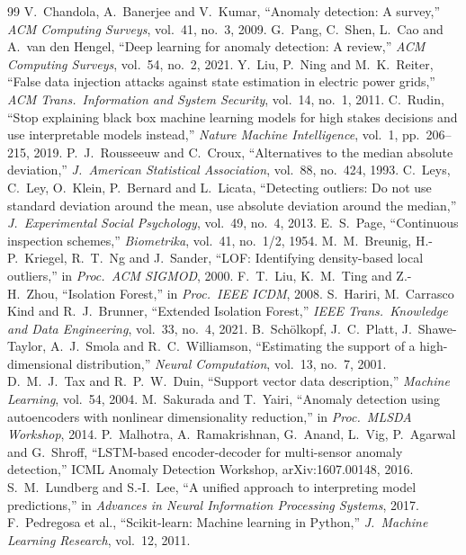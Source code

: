 \documentclass[11pt,a4paper]{article}
\begin{document}
\begin{thebibliography}{99}
 V.~Chandola, A.~Banerjee and V.~Kumar, ``Anomaly detection: A survey,'' \emph{ACM Computing Surveys}, vol.~41, no.~3, 2009.
 G.~Pang, C.~Shen, L.~Cao and A.~van den Hengel, ``Deep learning for anomaly detection: A review,'' \emph{ACM Computing Surveys}, vol.~54, no.~2, 2021.
 Y.~Liu, P.~Ning and M.~K.~Reiter, ``False data injection attacks against state estimation in electric power grids,'' \emph{ACM Trans.\ Information and System Security}, vol.~14, no.~1, 2011.
 C.~Rudin, ``Stop explaining black box machine learning models for high stakes decisions and use interpretable models instead,'' \emph{Nature Machine Intelligence}, vol.~1, pp.~206--215, 2019.
 P.~J.~Rousseeuw and C.~Croux, ``Alternatives to the median absolute deviation,'' \emph{J.\ American Statistical Association}, vol.~88, no.~424, 1993.
 C.~Leys, C.~Ley, O.~Klein, P.~Bernard and L.~Licata, ``Detecting outliers: Do not use standard deviation around the mean, use absolute deviation around the median,'' \emph{J.\ Experimental Social Psychology}, vol.~49, no.~4, 2013.
 E.~S.~Page, ``Continuous inspection schemes,'' \emph{Biometrika}, vol.~41, no.~1/2, 1954.
 M.~M.~Breunig, H.-P.~Kriegel, R.~T.~Ng and J.~Sander, ``LOF: Identifying density-based local outliers,'' in \emph{Proc.\ ACM SIGMOD}, 2000.
 F.~T.~Liu, K.~M.~Ting and Z.-H.~Zhou, ``Isolation Forest,'' in \emph{Proc.\ IEEE ICDM}, 2008.
 S.~Hariri, M.~Carrasco Kind and R.~J.~Brunner, ``Extended Isolation Forest,'' \emph{IEEE Trans.\ Knowledge and Data Engineering}, vol.~33, no.~4, 2021.
 B.~Schölkopf, J.~C.~Platt, J.~Shawe-Taylor, A.~J.~Smola and R.~C.~Williamson, ``Estimating the support of a high-dimensional distribution,'' \emph{Neural Computation}, vol.~13, no.~7, 2001.
 D.~M.~J.~Tax and R.~P.~W.~Duin, ``Support vector data description,'' \emph{Machine Learning}, vol.~54, 2004.
 M.~Sakurada and T.~Yairi, ``Anomaly detection using autoencoders with nonlinear dimensionality reduction,'' in \emph{Proc.\ MLSDA Workshop}, 2014.
 P.~Malhotra, A.~Ramakrishnan, G.~Anand, L.~Vig, P.~Agarwal and G.~Shroff, ``LSTM-based encoder-decoder for multi-sensor anomaly detection,'' ICML Anomaly Detection Workshop, arXiv:1607.00148, 2016.
 S.~M.~Lundberg and S.-I.~Lee, ``A unified approach to interpreting model predictions,'' in \emph{Advances in Neural Information Processing Systems}, 2017.
 F.~Pedregosa et al., ``Scikit-learn: Machine learning in Python,'' \emph{J.\ Machine Learning Research}, vol.~12, 2011.
\end{thebibliography}
\end{document}
